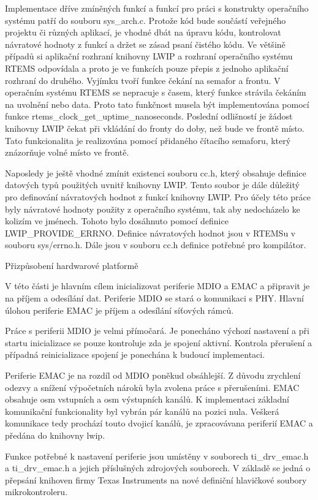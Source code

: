 Implementace dříve zmíněných funkcí a funkcí pro práci s konstrukty operačního systému patří do souboru sys\_arch.c.
Protože kód bude součástí veřejného projektu či různých aplikací, je vhodné dbát na úpravu kódu, kontrolovat návratové hodnoty z funkcí a držet se zásad psaní čistého kódu.
Ve většině případů si aplikační rozhraní knihovny LWIP a rozhraní operačního systému RTEMS odpovídala a proto je ve funkcích pouze přepis z jednoho aplikační rozhraní do druhého.
Vyjímku tvoří funkce čekání na semafor a frontu.
V operačním systému RTEMS se nepracuje s časem, který funkce strávila čekáním na uvolnění nebo data.
Proto tato funkčnost musela být implementována pomocí funkce rtems\_clock\_get\_uptime\_nanoseconds.
Poslední odlišností je žádost knihovny LWIP čekat při vkládání do fronty do doby, než bude ve frontě místo.
Tato funkcionalita je realizována pomocí přidaného čítacího semaforu, který znázorňuje volné místo ve frontě.

Naposledy je ještě vhodné zmínit existenci souboru cc.h, který obsahuje definice datových typů použitých uvnitř knihovny LWIP.
Tento soubor je dále důležitý pro definování návratových hodnot z funkcí knihovny LWIP.
Pro účely této práce byly návratové hodnoty použity z operačního systému, tak aby nedocházelo ke kolizím ve jménech.
Tohoto bylo dosáhnuto pomocí definice LWIP\_PROVIDE\_ERRNO.
Definice návratových hodnot jsou v RTEMSu v souboru sys/errno.h.
Dále jsou v souboru cc.h definice potřebné pro kompilátor.

\secc Přizpůsobení hardwarové platformě

V této části je hlavním cílem inicializovat periferie MDIO a EMAC a připravit je na příjem a odesílání dat.
Periferie MDIO se stará o komunikaci s PHY.
Hlavní úlohou periferie EMAC je příjem a odesílání síťových rámců. 

Práce s periferii MDIO je velmi přímočará.
Je ponecháno výchozí nastavení a při startu inicializace se pouze kontroluje zda je spojení aktivní.
Kontrola přerušení a případná reinicializace spojení je ponechána k budoucí implementaci.

Periferie EMAC je na rozdíl od MDIO poněkud obsáhlejší.
Z důvodu zrychlení odezvy a snížení výpočetních nároků byla zvolena práce s přerušeními.
EMAC obsahuje osm vstupních a osm výstupních kanálů.
K implementaci základní komunikační funkcionality byl vybrán pár kanálů na pozici nula.
Veškerá komunikace tedy prochází touto dvojicí kanálů, je zpracovávana periferií EMAC a předána do knihovny lwip.

Funkce potřebné k nastavení periferie jsou umístěny v souborech ti\_drv\_emac.h a ti\_drv\_emac.h a jejich příslušných zdrojových souborech.
V základě se jedná o přepsání knihoven firmy Texas Instruments na nové definiční hlavičkové soubory mikrokontroleru.

